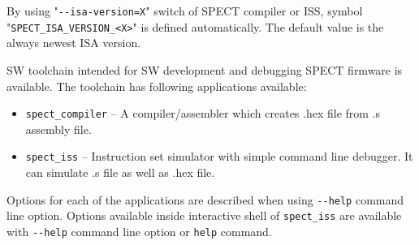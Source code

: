 \documentclass{tropic_design_spec}
\begin{document}
By using "\texttt{-{}-isa-version=X}" switch of SPECT compiler or ISS, symbol\linebreak
"\texttt{SPECT_ISA_VERSION_<X>}" is defined automatically. The default value is the always newest ISA version.


SW toolchain intended for SW development and debugging SPECT firmware is available. The toolchain
has following applications available:

\begin{itemize}
    \item \texttt{spect_compiler} -- A compiler/assembler which creates .hex file from .s
                            assembly file.
    \item \texttt{spect_iss} -- Instruction set simulator with simple command line debugger.
                       It can simulate .s file as well as .hex file.
\end{itemize}

Options for each of the applications are described when using \texttt{-{}-help}
command line option. Options available inside interactive shell of
\texttt{spect_iss} are available with \texttt{-{}-help} command line option or \texttt{help}
command.


\PrintOpenIssueSummary
\end{document}
